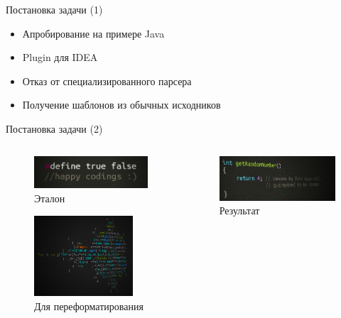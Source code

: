 \documentclass[sans]{beamer}
\begin{document}
\begin{frame}{Постановка задачи (1)}
	\begin{itemize}
		\item Апробирование на примере Java
		\item Plugin для IDEA
	\end{itemize}
	\begin{itemize}
		\item Отказ от специализированного парсера
		\item Получение шаблонов из обычных исходников
	\end{itemize}
\end{frame}

\begin{frame}{Постановка задачи (2)}
	\begin{columns}[T]
		\begin{column}{.5\textwidth}
			\begin{figure}
				\includegraphics[width = \linewidth]{images/trueFalse.png}
				\caption{Эталон}
			\end{figure}
			\begin{figure}
				\includegraphics[height = 3cm, width = \linewidth]{images/mandel.png}
				\caption{Для переформатирования}
			\end{figure}
		\end{column}

		\pause

		\begin{column}{.5\textwidth}
		\begin{minipage}[c][0.8\textheight][c]{\linewidth}
			\begin{figure}[c]
				\includegraphics[width = \linewidth]{images/rand.png}
				\caption{Результат}
			\end{figure}
		\end{minipage}
		\end{column}
	\end{columns}
\end{frame}
\end{document}
